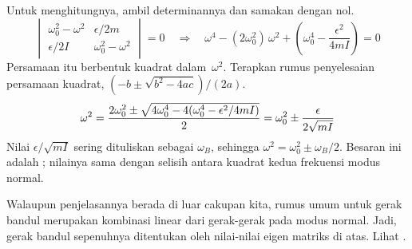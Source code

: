 Untuk menghitungnya,
ambil determinannya dan samakan dengan nol.
\begin{equation*}
  \begin{vmatrix}
    \omega_0^2-\omega^2    &\epsilon/2m  \\
    \epsilon/2I &\omega_0^2-\omega^2
  \end{vmatrix}=0 \quad\Longrightarrow\quad
  \omega^4-(2\omega_0^2)\,\omega^2 +(\omega_0^4
  -\frac{\epsilon^2}{4mI})=0
\end{equation*}
Persamaan itu berbentuk kuadrat dalam~$\omega^2$.  
Terapkan rumus penyelesaian persamaan kuadrat, $(-b\pm\sqrt{b^2-4ac})/(2a)$.
\begin{equation*}   %
  \omega^2 
  =\frac{2\omega_0^2
    \pm\sqrt{\smash[b]{\strut} 4\omega_0^4
      -4(\omega_0^4-\epsilon^2/4mI)}}{2}
  =\omega_0^2\pm\frac{\epsilon}{2\sqrt{mI}}
\end{equation*}
Nilai $\epsilon/\sqrt{mI}$ sering dituliskan sebagai
$\omega_B$, sehingga
$
\omega^2 =\omega_0^2\pm\omega_B/2
$.
Besaran ini adalah ; nilainya sama dengan selisih
antara kuadrat kedua frekuensi modus normal.

Walaupun penjelasannya berada di luar cakupan kita, rumus umum untuk 
gerak bandul merupakan kombinasi linear dari gerak-gerak pada 
modus normal.
Jadi, gerak bandul sepenuhnya ditentukan oleh nilai-nilai eigen
matriks di atas.
Lihat \cite{BergMarshall}.

